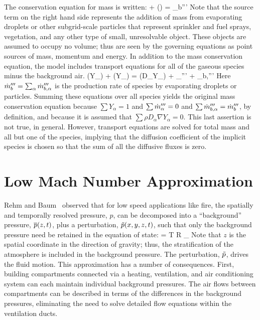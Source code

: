 The conservation equation for mass is written:
\be {} + \nabla\!\cdot (\rho \bu)  =  \dm_b'''  \label{mass} \ee
Note that the source term on the right hand side represents the addition of mass from evaporating droplets or other subgrid-scale
particles that represent sprinkler and fuel sprays, vegetation, and any other type of small, unresolvable object. These
objects are assumed to occupy no volume; thus are seen by the governing equations as point sources of mass, momentum and energy.
In addition to the mass conservation equation, the model includes transport equations for all of the gaseous species minus the
background air.
\be {}(\rho Y_\alpha) + \nabla\!\cdot (\rho Y_\alpha \bu) = \nabla\!\cdot (\rho D_\alpha \nabla Y_\alpha) + \dm_\alpha''' + \dm_{b,\alpha}''' \label{species} \ee
Here $\dot{m}_b'''=\sum_\alpha \dot{m}_{b,\alpha}'''$ is the production rate of species by evaporating droplets or particles.
Summing these equations over all species yields the original mass conservation equation because
$\sum Y_\alpha=1$ and $\sum \dot{m}_\alpha''' = 0$ and $\sum \dot{m}_{b,\alpha}'''=\dot{m}_b'''$, by definition, and because it is assumed
that $\sum \rho D_\alpha \nabla Y_\alpha = 0$. This last assertion is not true, in general.
However, transport equations are solved for total
mass and all but one of the species, implying that the diffusion coefficient of the implicit species is
chosen so that the sum of all the diffusive fluxes is zero.

\section{Low Mach Number Approximation}

Rehm and Baum~\cite{Rehm:1} observed that for low speed applications like fire, the
spatially and temporally resolved pressure, $p$, can be decomposed into a ``background'' pressure,
$\overline{p}(z,t)$, plus a perturbation, $\tilde{p}(x,y,z,t)$, such that only the background pressure need be retained in the
equation of state:
\be \bp = \rho T {\cal R} \sum_\alpha  {} \equiv {}  \label{basicstate1} \ee
Note that $z$ is the spatial coordinate in the direction of gravity; thus, the stratification of the atmosphere is included in
the background pressure. The perturbation, $\tilde{p}$, drives the fluid motion.
This approximation has a number of consequences. First, building compartments connected via a heating, ventilation, and air
conditioning system can each maintain individual background pressures. The air flows between compartments can be
described in terms of the differences in the background pressures, eliminating the need to solve detailed flow
equations within the ventilation ducts.

